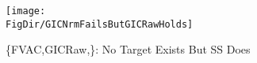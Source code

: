 \begin{figure}[tbp]
\centerline{\texttt{[image: \\FigDir/GICNrmFailsButGICRawHolds]}}
\caption{\{{FVAC},{GICRaw},\}: No Target Exists But SS Does}
\label{fig:GICNrmFailsButGICRawHolds}
\end{figure}
